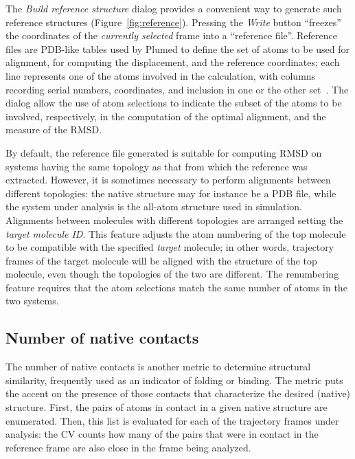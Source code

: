 \documentclass[preprint,review,11pt]{elsarticle}
\begin{document}
The \emph{Build reference structure} dialog provides a convenient way
to generate such reference structures (Figure~\ref{fig:reference}).
Pressing the \emph{Write} button ``freezes'' the coordinates of the
\emph{currently selected} frame into a ``reference file''.  Reference
files are PDB-like tables used by Plumed to define the set of atoms to be used for
alignment, for computing the displacement, and the reference
coordinates; each line represents one of the atoms involved in the
calculation, with columns recording serial numbers, coordinates, and
inclusion in one or the other set~\cite{plumed_manual}.  The dialog
allow the use of   atom selections to indicate the  subset of the atoms 
to be involved,
respectively, in the computation of the optimal alignment, and the
measure of the RMSD.






By default, the reference file generated is suitable for computing
RMSD on systems having the same topology as that from which the
reference was extracted.  However, it is sometimes necessary to
perform alignments between different topologies: the native structure
may for instance be a PDB file, while the system under analysis is the
all-atom structure used in simulation. Alignments between molecules
with different topologies are arranged setting the \emph{target
  molecule ID}. This feature adjusts the atom numbering of the top
molecule to be compatible with the specified \emph{target} molecule;
in other words, trajectory frames of the target molecule will be
aligned with the structure of the top molecule, even though the
topologies of the two are different. The renumbering feature requires
that the atom selections match the same number of atoms in the two
systems.





\subsection{Number of native contacts}

The number of native contacts is another metric  to
determine structural similarity, frequently used as an indicator of folding
or binding.  The metric puts the accent on the presence of those
contacts that characterize the desired (native) structure. First, the
pairs of atoms in contact in a given native structure are
enumerated. Then, this list is evaluated
for each of the trajectory frames under analysis: the 
CV counts how many of the pairs that were in contact in the
reference frame are also close in the frame being analyzed.  
\end{document}

